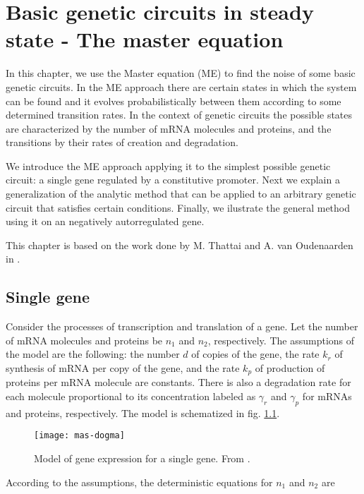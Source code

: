 \chapter{Basic genetic circuits in steady state - The master equation}
\label{ch:master}

In this chapter, we use the Master equation (ME) to find the noise of some basic genetic circuits. In the ME approach there are certain states in which the system can be found and it evolves probabilistically between them according to some determined transition rates. In the context of genetic circuits the possible states are characterized by the number of mRNA molecules and proteins, and the transitions by their rates of creation and degradation.

We introduce the ME approach applying it to the simplest possible genetic circuit: a single gene regulated by a constitutive promoter. Next we explain a generalization of the analytic method that can be applied to an arbitrary genetic circuit that satisfies certain conditions. Finally, we ilustrate the general method using it on an negatively autorregulated gene.

This chapter is based on the work done by M. Thattai and A. van Oudenaarden in \cite{thattai01}.

\section{Single gene}
\label{sec:mas-single_gene}
Consider the processes of transcription and translation of a gene. Let the number of mRNA molecules and proteins be $n_1$ and $n_2$, respectively. The assumptions of the model are the following: the number $d$ of copies of the gene, the rate $k_r$ of synthesis of mRNA per copy of the gene, and the rate $k_p$ of production of proteins per mRNA molecule are constants. There is also a degradation rate for each molecule proportional to its concentration labeled as $\gamma_r$ and $\gamma_p$ for mRNAs and proteins, respectively. The model is schematized in fig. \ref{fig:mas-dogma}.

\begin{figure}[H]
  \centering
  \texttt{[image: mas-dogma]}
  \caption[Model of gene expression for a single gene]{\label{fig:mas-dogma} Model of gene expression for a single gene. From \cite{thattai01}.}
\end{figure}

According to the assumptions, the deterministic equations for $n_1$ and $n_2$ are

